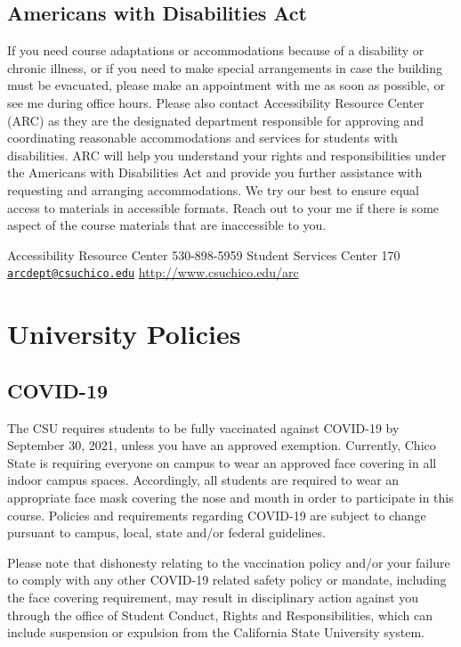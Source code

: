 \documentclass[
]{article}
\begin{document}
\hypertarget{americans-with-disabilities-act}{%
\subsection{Americans with Disabilities
Act}\label{americans-with-disabilities-act}}

If you need course adaptations or accommodations because of a disability
or chronic illness, or if you need to make special arrangements in case
the building must be evacuated, please make an appointment with me as
soon as possible, or see me during office hours. Please also contact
Accessibility Resource Center (ARC) as they are the designated
department responsible for approving and coordinating reasonable
accommodations and services for students with disabilities. ARC will
help you understand your rights and responsibilities under the Americans
with Disabilities Act and provide you further assistance with requesting
and arranging accommodations. We try our best to ensure equal access to
materials in accessible formats. Reach out to your me if there is some
aspect of the course materials that are inaccessible to you.

Accessibility Resource Center 530-898-5959 Student Services Center 170
\href{mailto:arcdept@csuchico.edu}{\nolinkurl{arcdept@csuchico.edu}}
\href{https://www.csuchico.edu/arc/}{http://www.csuchico.edu/arc}

\hypertarget{university-policies}{%
\section{University Policies}\label{university-policies}}

\hypertarget{covid-19}{%
\subsection{COVID-19}\label{covid-19}}

The CSU requires students to be fully vaccinated against COVID-19 by
September 30, 2021, unless you have an approved exemption. Currently,
Chico State is requiring everyone on campus to wear an approved face
covering in all indoor campus spaces. Accordingly, all students are
required to wear an appropriate face mask covering the nose and mouth in
order to participate in this course. Policies and requirements regarding
COVID-19 are subject to change pursuant to campus, local, state and/or
federal guidelines.

Please note that dishonesty relating to the vaccination policy and/or
your failure to comply with any other COVID-19 related safety policy or
mandate, including the face covering requirement, may result in
disciplinary action against you through the office of Student Conduct,
Rights and Responsibilities, which can include suspension or expulsion
from the California State University system.
\end{document}
